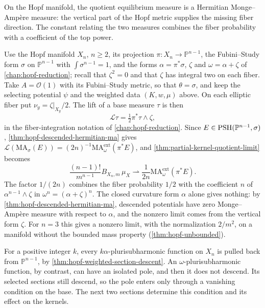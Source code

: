 On the Hopf manifold, the quotient equilibrium measure is a Hermitian Monge--Amp\`ere measure: the vertical part of the Hopf metric supplies the missing fiber direction. The constant relating the two measures combines the fiber probability with a coefficient of the top power.

Use the Hopf manifold $X_n$, $n\geq2$, its projection $\pi\colon X_n\to\mathbb P^{n-1}$, the Fubini--Study form $\sigma$ on $\mathbb P^{n-1}$ with $\int\sigma^{n-1}=1$, and the forms $\alpha=\pi^*\sigma$, $\zeta$ and $\omega=\alpha+\zeta$ of \cref{chap:hopf-reduction}; recall that $\zeta^2=0$ and that $\zeta$ has integral two on each fiber. Take $A=\mathcal O(1)$ with its Fubini--Study metric, so that $\theta=\sigma$, and keep the selecting potential $\psi$ and the weighted data $(K,w,\mu)$ above. On each elliptic fiber put $\nu_y=\zeta|_{X_y}/2$. The lift of a base measure $\tau$ is then
\[
 \mathcal L\tau=\tfrac12\pi^*\tau\wedge\zeta,
\]
in the fiber-integration notation of \cref{chap:hopf-reduction}. Since $E\in\mathrm{PSH}(\mathbb P^{n-1},\sigma)$, \cref{thm:hopf-descended-hermitian-ma} gives $\mathcal L(\mathrm{MA}_\sigma(E))=(2n)^{-1}\mathrm{MA}^{\mathrm{ext}}_\omega(\pi^*E)$, and \cref{thm:partial-kernel-quotient-limit} becomes
\begin{equation}\label{eq:hopf-partial-equilibrium}
 \frac{(n-1)!}{m^{n-1}}B_{X_n,m}\,\mu_X
       \rightharpoonup
       \frac{1}{2n}\mathrm{MA}^{\mathrm{ext}}_\omega(\pi^*E).
\end{equation}
The factor $1/(2n)$ combines the fiber probability $1/2$ with the coefficient $n$ of $\alpha^{n-1}\wedge\zeta$ in $\omega^n=(\alpha+\zeta)^n$. The closed curvature form $\alpha$ alone gives nothing: by \cref{thm:hopf-descended-hermitian-ma}, descended potentials have zero Monge--Amp\`ere measure with respect to $\alpha$, and the nonzero limit comes from the vertical form $\zeta$. For $n=3$ this gives a nonzero limit, with the normalization $2/m^2$, on a manifold without the bounded mass property (\cref{thm:hopf-unbounded}).

For a positive integer $k$, every $k\alpha$-plurisubharmonic function on $X_n$ is pulled back from $\mathbb P^{n-1}$, by \cref{thm:hopf-weighted-section-descent}. An $\omega$-plurisubharmonic function, by contrast, can have an isolated pole, and then it does not descend. Its selected sections still descend, so the pole enters only through a vanishing condition on the base. The next two sections determine this condition and its effect on the kernels.



